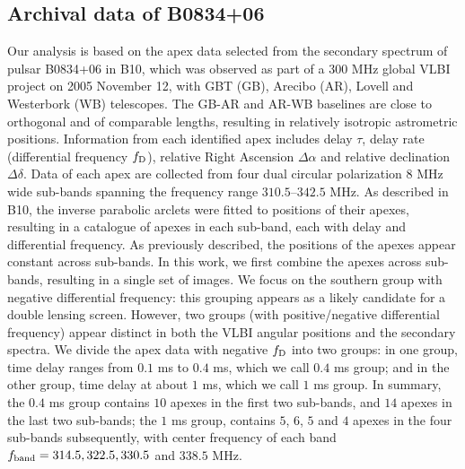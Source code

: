 \documentclass[useAMS,usenatbib]{mn2e}
\begin{document}
\subsection{Archival data of B0834+06}
\label{21}
Our analysis is based on the apex data selected from the secondary
spectrum of pulsar B0834+06 in B10, which was
observed as part of a 300 MHz global VLBI project on 2005 November 12, with
GBT (GB), Arecibo (AR), Lovell and Westerbork (WB) telescopes.  The GB-AR and AR-WB
baselines are close to orthogonal and of comparable lengths, resulting
in relatively isotropic astrometric positions.
Information from each identified apex includes delay $\tau$,
delay rate (differential frequency $f_{\rm D}$), relative Right Ascension
$\Delta\alpha$ and relative declination $\Delta\delta$.
Data of each apex are collected from four dual circular polarization $8$ MHz wide sub-bands spanning the frequency range $310.5$--$342.5$ MHz. 
As described in B10, the inverse parabolic
arclets were fitted to positions of their apexes, resulting in a
catalogue of apexes in each sub-band, each with delay and differential
frequency.  As previously described, the positions of the apexes
appear constant across sub-bands.  In this work, we first combine the
apexes across sub-bands, resulting in a single set of images.  We focus on
the southern group with negative differential frequency: this
grouping appears as a likely candidate for a double lensing screen. However, two groups (with positive/negative differential frequency) appear distinct in both the VLBI angular positions and the secondary spectra. We divide the apex data with negative $f_{\rm D}$ into two
groups: in one group, time delay ranges from $0.1$ ms to $0.4$ ms,
which we call $0.4$ ms group; and in the other group, time delay at
about $1$ ms, which we call $1$ ms group.  In summary, the
$0.4$ ms group contains $10$ apexes in the first two sub-bands, and $14$ apexes in the last two sub-bands; the $1$ ms group, contains $5$, $6$, $5$ and $4$ apexes in the four sub-bands subsequently, with center frequency of each band $f_{\rm band}=314.5, 322.5, 330.5$ and $ 338.5$ MHz. 
\end{document}

